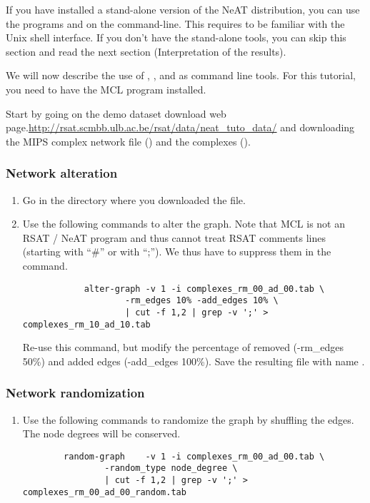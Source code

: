 If you have installed a stand-alone version of the NeAT distribution,
you can use the programs  and  on the
command-line. This requires to be familiar with the Unix shell
interface. If you don't have the stand-alone tools, you can skip this
section and read the next section (Interpretation of the results).

We will now describe the use of , ,   and  as command line tools. For this tutorial, you need to have the MCL program installed. 

Start by going on the demo dataset download web page.\url{http://rsat.scmbb.ulb.ac.be/rsat/data/neat\_tuto\_data/} and downloading the MIPS complex network file () and the complexes ().


\subsubsection{Network alteration}

\begin{enumerate}

\item Go in the directory where you downloaded the file.
\item Use the following commands to alter the graph. Note that MCL is not an RSAT / NeAT program and thus cannot treat RSAT comments lines (starting with ``\#'' or with ``;''). We thus have to suppress them in the command.
{\color{Blue} \begin{footnotesize} 
		\begin{verbatim}
			alter-graph	-v 1 -i complexes_rm_00_ad_00.tab \
					-rm_edges 10% -add_edges 10% \
					| cut -f 1,2 | grep -v ';' > complexes_rm_10_ad_10.tab
		\end{verbatim} \end{footnotesize}
	}
Re-use this command, but modify the percentage of removed (-rm\_edges 50\%) and added edges (-add\_edges 100\%). Save the resulting file with name .
\end{enumerate}
\subsubsection{Network randomization}
\begin{enumerate}
\item Use the following commands to randomize the graph by shuffling the edges. The node degrees will be conserved.
{\color{Blue} \begin{footnotesize} 
		\begin{verbatim}
		random-graph 	-v 1 -i complexes_rm_00_ad_00.tab \
				-random_type node_degree \
				| cut -f 1,2 | grep -v ';' > complexes_rm_00_ad_00_random.tab
		\end{verbatim} \end{footnotesize}
	}
\end{enumerate}
